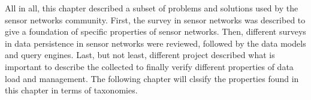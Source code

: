All in all, this chapter described a subset of problems and solutions used by
the sensor networks community. First, the survey in sensor networks was
described to give a foundation of specific properties of sensor networks. Then,
different surveys in data persistence in sensor networks were reviewed,
followed by the data models and query engines. Last, but not least, different
project described what is important to describe the collected to finally verify
different properties of data load and management. The following chapter will
clssify the properties found in this chapter in terms of taxonomies.
